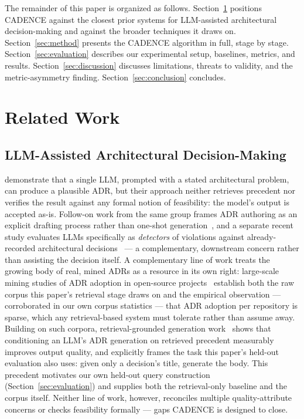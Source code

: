 \documentclass[preprint,12pt,authoryear]{elsarticle}
\renewcommand{\_}{\textunderscore\allowbreak{}}
\begin{document}
The remainder of this paper is organized as follows. Section~\ref{sec:related} positions CADENCE against the closest prior systems for LLM-assisted architectural decision-making and against the broader techniques it draws on. Section~\ref{sec:method} presents the CADENCE algorithm in full, stage by stage. Section~\ref{sec:evaluation} describes our experimental setup, baselines, metrics, and results. Section~\ref{sec:discussion} discusses limitations, threats to validity, and the metric-asymmetry finding. Section~\ref{sec:conclusion} concludes.

\section{Related Work}
\label{sec:related}

\subsection{LLM-Assisted Architectural Decision-Making}

\citet{dhar2024llm} demonstrate that a single LLM, prompted with a stated architectural problem, can produce a plausible ADR, but their approach neither retrieves precedent nor verifies the result against any formal notion of feasibility: the model's output is accepted as-is. Follow-on work from the same group frames ADR authoring as an explicit drafting process rather than one-shot generation~\citep{dhar2025drafting}, and a separate recent study evaluates LLMs specifically as \emph{detectors} of violations against already-recorded architectural decisions~\citep{su2026violations} --- a complementary, downstream concern rather than assisting the decision itself. A complementary line of work treats the growing body of real, mined ADRs as a resource in its own right: large-scale mining studies of ADR adoption in open-source projects~\citep{buchgeher2023adr} establish both the raw corpus this paper's retrieval stage draws on and the empirical observation --- corroborated in our own corpus statistics --- that ADR adoption per repository is sparse, which any retrieval-based system must tolerate rather than assume away. Building on such corpora, retrieval-grounded generation work~\citep{contextmatters2026,contextmatters-zenodo} shows that conditioning an LLM's ADR generation on retrieved precedent measurably improves output quality, and explicitly frames the task this paper's held-out evaluation also uses: given only a decision's title, generate the body. This precedent motivates our own held-out query construction (Section~\ref{sec:evaluation}) and supplies both the retrieval-only baseline and the corpus itself. Neither line of work, however, reconciles multiple quality-attribute concerns or checks feasibility formally --- gaps CADENCE is designed to close.
\end{document}
